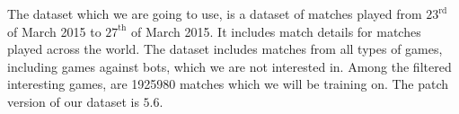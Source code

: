 The dataset which we are going to use, is a dataset of matches played from $23^{\text{rd}}$ of March 2015 to $27^{\text{th}}$ of March 2015. It includes match details for matches played across the world. The dataset includes matches from all types of games, including games against bots, which we are not interested in. Among the filtered interesting games, are 1925980 matches which we will be training on. The patch version of our dataset is $5.6$.

